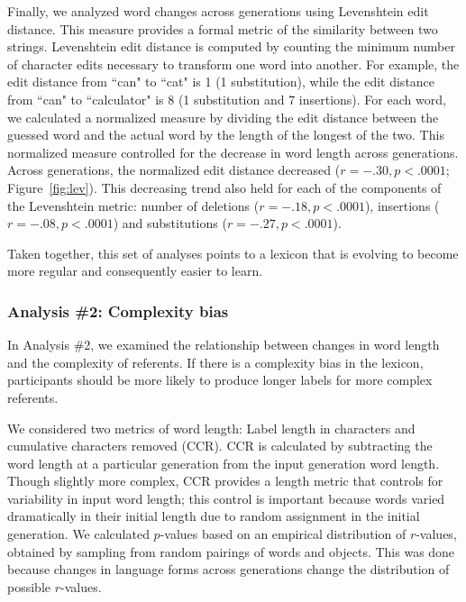 
Finally, we analyzed word changes across generations using Levenshtein edit distance. This measure provides a formal metric of the similarity between two strings. Levenshtein edit distance is computed by counting the minimum number of character edits necessary to transform one word into another. For example, the edit distance from ``can" to ``cat" is 1 (1 substitution), while the edit distance from ``can" to ``calculator" is 8 (1 substitution and 7 insertions). For each word, we calculated a normalized measure by dividing the edit distance between the guessed word and the actual word by the length of the longest of the two. This normalized measure controlled for the decrease in word length across generations.  Across generations, the normalized edit distance decreased ($r=-.30, p<.0001$; Figure\ \ref{fig:lev}). This decreasing trend also held for each of the components of the Levenshtein metric: number of deletions ($r=-.18, p<.0001$), insertions ($r=-.08, p<.0001$) and substitutions ($r=-.27, p<.0001$). 

Taken together, this set of analyses points to a lexicon that is evolving to become more regular and consequently easier to learn.



                         



\subsubsection{Analysis \#2: Complexity bias} 

In Analysis \#2, we examined the relationship between changes in word length and the complexity of referents. If there is a complexity bias in the lexicon, participants should be more likely to produce longer labels for more complex referents. 

We considered two metrics of word length: Label length in characters and cumulative characters removed (CCR). CCR is calculated by subtracting the word length at a particular generation from the input generation word length. Though slightly more complex, CCR provides a length metric that controls for variability in input word length; this control is important because words varied dramatically in their initial length due to random assignment in the initial generation. We calculated $p$-values based on an empirical distribution of $r$-values, obtained by sampling from random pairings of words and objects. This was done because changes in  language forms across generations change the distribution of possible $r$-values.

